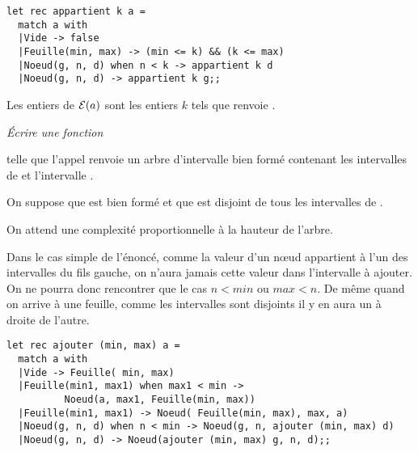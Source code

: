 \begin{Answer}
\begin{lstlisting}
let rec appartient k a =
  match a with
  |Vide -> false
  |Feuille(min, max) -> (min <= k) && (k <= max)
  |Noeud(g, n, d) when n < k -> appartient k d
  |Noeud(g, n, d) -> appartient k g;;
\end{lstlisting}
\end{Answer}
Les entiers de ${\cal E}(a)$ sont les entiers $k$ tels que  renvoie .
\begin{Exercise}\it
Écrire une fonction 

telle que l'appel  renvoie un arbre d'intervalle bien formé contenant les intervalles de  et l'intervalle .

On suppose que  est bien formé et que  est disjoint de tous les intervalles de .

On attend une complexité proportionnelle à la hauteur de l'arbre.
\end{Exercise}
\begin{Answer}
Dans le cas simple de l'énoncé, comme la valeur d'un nœud appartient à l'un des intervalles du fils gauche, on n'aura jamais cette valeur dans l'intervalle à ajouter. On ne pourra donc rencontrer que le cas $n< min$ ou $max < n$. De même quand on arrive à une feuille, comme les intervalles sont disjoints il y en aura un à droite de l'autre.
\begin{lstlisting}
let rec ajouter (min, max) a =
  match a with
  |Vide -> Feuille( min, max)
  |Feuille(min1, max1) when max1 < min -> 
          Noeud(a, max1, Feuille(min, max))
  |Feuille(min1, max1) -> Noeud( Feuille(min, max), max, a)
  |Noeud(g, n, d) when n < min -> Noeud(g, n, ajouter (min, max) d)
  |Noeud(g, n, d) -> Noeud(ajouter (min, max) g, n, d);;
  
\end{lstlisting}
\end{Answer}
